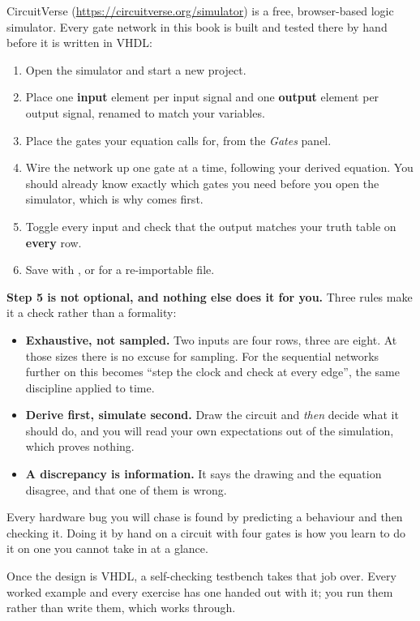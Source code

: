 CircuitVerse (\url{https://circuitverse.org/simulator}) is a free, browser-based logic simulator.
Every gate network in this book is built and tested there by hand before it is written in VHDL:
\begin{enumerate}
  \item Open the simulator and start a new project.
  \item Place one \textbf{input} element per input signal and one \textbf{output} element per
    output signal, renamed to match your variables.
  \item Place the gates your equation calls for, from the \emph{Gates} panel.
  \item Wire the network up one gate at a time, following your derived equation. You should
    already know exactly which gates you need before you open the simulator, which is why
     comes first.
  \item Toggle every input and check that the output matches your truth table on \textbf{every}
    row.
  \item Save with , or  for a
    re-importable  file.
\end{enumerate}

\textbf{Step 5 is not optional, and nothing else does it for you.} Three rules make it a check
rather than a formality:
\begin{itemize}
  \item \textbf{Exhaustive, not sampled.} Two inputs are four rows, three are eight. At those
    sizes there is no excuse for sampling. For the sequential networks further on this becomes
    ``step the clock and check at every edge'', the same discipline applied to time.
  \item \textbf{Derive first, simulate second.} Draw the circuit and \emph{then} decide what it
    should do, and you will read your own expectations out of the simulation, which proves
    nothing.
  \item \textbf{A discrepancy is information.} It says the drawing and the equation disagree, and
    that one of them is wrong.
\end{itemize}

Every hardware bug you will chase is found by predicting a behaviour and then checking it. Doing it
by hand on a circuit with four gates is how you learn to do it on one you cannot take in at a
glance.

Once the design is VHDL, a self-checking testbench takes that job over. Every worked example and
every exercise has one handed out with it; you run them rather than write them, which
 works through.


